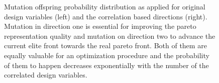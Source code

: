 \begin{figure}[h!]
\begin{minipage}[b]{0.5\linewidth}
 \centering
\end{minipage}
\begin{minipage}[b]{0.5\linewidth}
 \centering
\end{minipage}
\caption{Mutation offspring probability distribution as applied for original design variables (left) and the correlation based directions (right). Mutation in direction one is essential for improving the pareto representation quality and mutation on direction two to advance the current elite front towards the real pareto front. Both of them are equally valuable for an optimization procedure and the probability of them to happen decreases exponentially with the number of the correlated design variables.}
\label{mut}
\end{figure}

